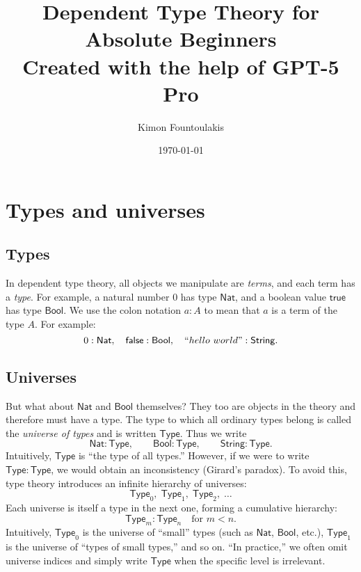 \documentclass{article}
\title{Dependent Type Theory for Absolute Beginners \\\vspace{0.2cm} 
\small Created with the help of GPT-5 Pro}
\author{Kimon Fountoulakis}
\date{\today}
\newcommand{\Type}{\ensuremath{\mathsf{Type}}}
\newcommand{\Nat}{\mathsf{Nat}}
\newcommand{\Bool}{\mathsf{Bool}}
\newcommand{\String}{\mathsf{String}}
\begin{document}
\maketitle
\tableofcontents
\newpage

\section{Types and universes}

\subsection*{Types}

In dependent type theory, all objects we manipulate are \emph{terms}, and each term has a \emph{type}.  
For example, a natural number \(0\) has type \(\Nat\), and a boolean value \(\mathsf{true}\) has type \(\Bool\). We use the colon notation \(a : A\) to mean that \(a\) is a term of the type \(A\).  
For example:
\[
0 : \Nat, \quad \mathsf{false} : \Bool, \quad ``hello \ world" : \String.
\]





\subsection*{Universes}

But what about \(\Nat\) and \(\Bool\) themselves?  
They too are objects in the theory and therefore must have a type.  
The type to which all ordinary types belong is called the \emph{universe of types} and is written \(\Type\).  
Thus we write
\[
\Nat : \Type, \qquad \Bool : \Type, \qquad \String : \Type.
\]
Intuitively, \(\Type\) is “the type of all types.”  
However, if we were to write \(\Type : \Type\), we would obtain an inconsistency (Girard’s paradox).  
To avoid this, type theory introduces an infinite hierarchy of universes:
\[
\Type_0,\;\Type_1,\;\Type_2,\;\dots
\]
Each universe is itself a type in the next one, forming a cumulative hierarchy:
\[
\Type_m : \Type_n \quad \text{for } m < n.
\]
Intuitively, $\Type_0$ is the universe of ``small'' types (such as $\Nat$, $\Bool$, etc.), $\Type_1$ is the universe of ``types of small types,'' and so on. ``In practice,'' we often omit universe indices and simply write $\Type$
when the specific level is irrelevant.
\end{document}
